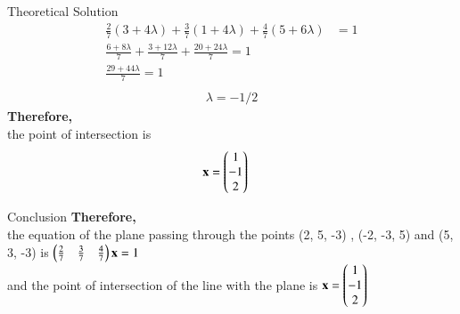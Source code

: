 \documentclass{beamer}
\begin{document}
\begin{frame}{Theoretical Solution }
\begin{align}
\tfrac{2}{7}(3+4\lambda) +\tfrac{3}{7}(1+4\lambda)+ \tfrac{4}{7}(5+6\lambda)&=1\\
\frac{6 + 8\lambda}{7} + \frac{3 + 12\lambda}{7} + \frac{20 + 24\lambda}{7} = 1\\
\frac{29 + 44\lambda}{7} = 1\\
\end{align}
\begin{align}
\lambda=-1/2
\end{align}
\textbf{Therefore,}\\
the point of intersection is
\begin{align}
\mathbf{x}&=\begin{pmatrix}1\\-1\\2\end{pmatrix}
\end{align}
\end{frame}
\begin{frame}{Conclusion}
\textbf{Therefore,}\\
the equation of the plane passing through the points (2, 5, -3) , (-2, -3, 5) and
(5, 3, -3) is $\begin{pmatrix}\tfrac{2}{7}&\tfrac{3}{7} &\tfrac{4}{7}\end{pmatrix}\mathbf{x}=1$\\
and the point of intersection of the line with the plane is $\mathbf{x}=\begin{pmatrix}1\\-1\\2\end{pmatrix}$
\end{frame}
\end{document}
